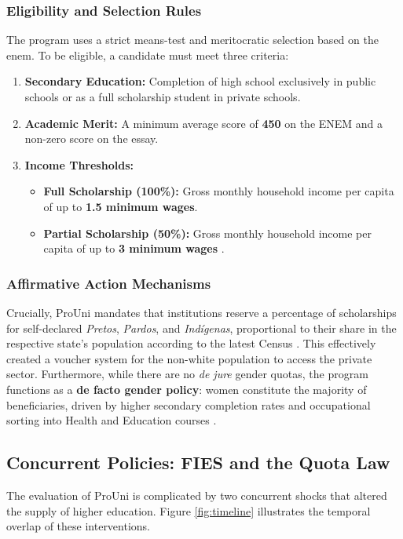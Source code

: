 \subsubsection{Eligibility and Selection Rules}
The program uses a strict means-test and meritocratic selection based on the \acrfull{enem}. To be eligible, a candidate must meet three criteria:
\begin{enumerate}
    \item \textbf{Secondary Education:} Completion of high school exclusively in public schools or as a full scholarship student in private schools.
    \item \textbf{Academic Merit:} A minimum average score of \textbf{450} on the ENEM and a non-zero score on the essay.
    \item \textbf{Income Thresholds:}
    \begin{itemize}
        \item \textbf{Full Scholarship (100\%):} Gross monthly household income per capita of up to \textbf{1.5 minimum wages}.
        \item \textbf{Partial Scholarship (50\%):} Gross monthly household income per capita of up to \textbf{3 minimum wages} \cite{MEC2024}.
    \end{itemize}
\end{enumerate}

\subsubsection{Affirmative Action Mechanisms}
Crucially, ProUni mandates that institutions reserve a percentage of scholarships for self-declared \textit{Pretos}, \textit{Pardos}, and \textit{Indígenas}, proportional to their share in the respective state's population according to the latest Census \cite{MEC2024}. This effectively created a voucher system for the non-white population to access the private sector. Furthermore, while there are no \textit{de jure} gender quotas, the program functions as a \textbf{de facto gender policy}: women constitute the majority of beneficiaries, driven by higher secondary completion rates and occupational sorting into Health and Education courses \cite{BusteloEtAl2021}.

\subsection{Concurrent Policies: FIES and the Quota Law}

The evaluation of ProUni is complicated by two concurrent shocks that altered the supply of higher education. Figure \ref{fig:timeline} illustrates the temporal overlap of these interventions.

